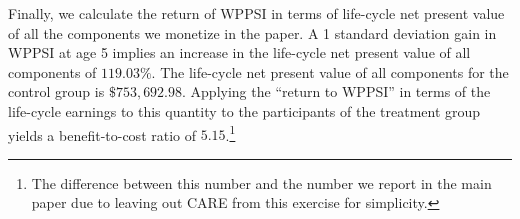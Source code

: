 \noindent Finally, we calculate the return of WPPSI in terms of life-cycle net present value of all the components we monetize in the paper. A 1 standard deviation gain in WPPSI at age 5 implies an increase in the life-cycle net present value of all components of $119.03\%$. The life-cycle net present value of all components for the control group is $\$753,692.98$. Applying the ``return to WPPSI'' in terms of the life-cycle earnings to this quantity to the participants of the treatment group yields a benefit-to-cost ratio of $5.15$.\footnote{The difference between this number and the number we report in the main paper due to leaving out CARE from this exercise for simplicity.}\\

\singlespace


